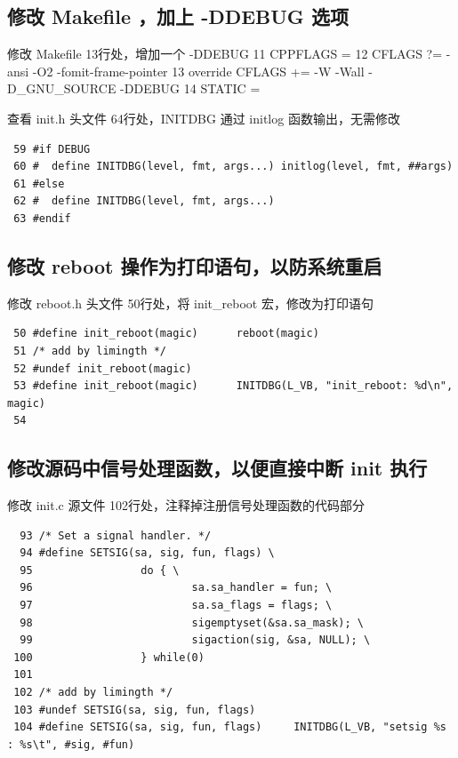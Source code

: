 \subsection{修改 Makefile ，加上 -DDEBUG 选项}

修改 Makefile 13行处，增加一个 -DDEBUG 11 CPPFLAGS = 12 CFLAGS ?= -ansi
-O2 -fomit-frame-pointer 13 override CFLAGS += -W -Wall -D\_GNU\_SOURCE
-DDEBUG 14 STATIC =

查看 init.h 头文件 64行处，INITDBG 通过 initlog 函数输出，无需修改

{\begin{shaded}\begin{verbatim}
 59 #if DEBUG
 60 #  define INITDBG(level, fmt, args...) initlog(level, fmt, ##args)
 61 #else
 62 #  define INITDBG(level, fmt, args...)
 63 #endif
\end{verbatim}\end{shaded}}
\subsection{修改 reboot 操作为打印语句，以防系统重启}

修改 reboot.h 头文件 50行处，将 init\_reboot 宏，修改为打印语句

{\begin{shaded}\begin{verbatim}
 50 #define init_reboot(magic)      reboot(magic)
 51 /* add by limingth */
 52 #undef init_reboot(magic)
 53 #define init_reboot(magic)      INITDBG(L_VB, "init_reboot: %d\n", magic)
 54 
\end{verbatim}\end{shaded}}
\subsection{修改源码中信号处理函数，以便直接中断 init 执行}

修改 init.c 源文件 102行处，注释掉注册信号处理函数的代码部分

{\begin{shaded}\begin{verbatim}
  93 /* Set a signal handler. */
  94 #define SETSIG(sa, sig, fun, flags) \
  95                 do { \
  96                         sa.sa_handler = fun; \
  97                         sa.sa_flags = flags; \
  98                         sigemptyset(&sa.sa_mask); \
  99                         sigaction(sig, &sa, NULL); \
 100                 } while(0)
 101 
 102 /* add by limingth */
 103 #undef SETSIG(sa, sig, fun, flags)
 104 #define SETSIG(sa, sig, fun, flags)     INITDBG(L_VB, "setsig %s : %s\t", #sig, #fun)
\end{verbatim}\end{shaded}}
